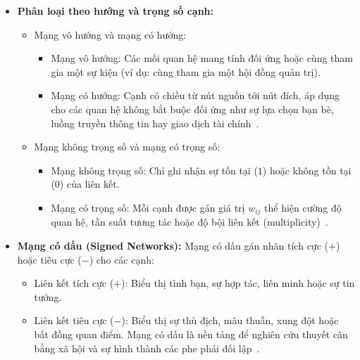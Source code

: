 \documentclass[14pt,a4paper]{extarticle}
\begin{document}
\begin{itemize}
    \item \textbf{Phân loại theo hướng và trọng số cạnh:}
    \begin{itemize}
        \item Mạng vô hướng và mạng có hướng:
        \begin{itemize}
            \item Mạng vô hướng: Các mối quan hệ mang tính đối ứng hoặc cùng tham gia một sự kiện (ví dụ: cùng tham gia một hội đồng quản trị).
            \item Mạng có hướng: Cạnh có chiều từ nút nguồn tới nút đích, áp dụng cho các quan hệ không bắt buộc đối ứng như sự lựa chọn bạn bè, luồng truyền thông tin hay giao dịch tài chính~\cite{Scott2012}.
        \end{itemize}
        \item Mạng không trọng số và mạng có trọng số:
        \begin{itemize}
            \item Mạng không trọng số: Chỉ ghi nhận sự tồn tại ($1$) hoặc không tồn tại ($0$) của liên kết.
            \item Mạng có trọng số: Mỗi cạnh được gán giá trị $w_{ij}$ thể hiện cường độ quan hệ, tần suất tương tác hoặc độ bội liên kết (multiplicity)~\cite{Traag2014}.
        \end{itemize}
    \end{itemize}

    \item \textbf{Mạng có dấu (Signed Networks):}
    \newline
    Mạng có dấu gán nhãn tích cực ($+$) hoặc tiêu cực ($-$) cho các cạnh:
    \begin{itemize}
        \item Liên kết tích cực ($+$): Biểu thị tình bạn, sự hợp tác, liên minh hoặc sự tin tưởng.
        \item Liên kết tiêu cực ($-$): Biểu thị sự thù địch, mâu thuẫn, xung đột hoặc bất đồng quan điểm. Mạng có dấu là nền tảng để nghiên cứu thuyết cân bằng xã hội và sự hình thành các phe phái đối lập~\cite{Traag2014}.
    \end{itemize}


\end{itemize}
\end{document}
